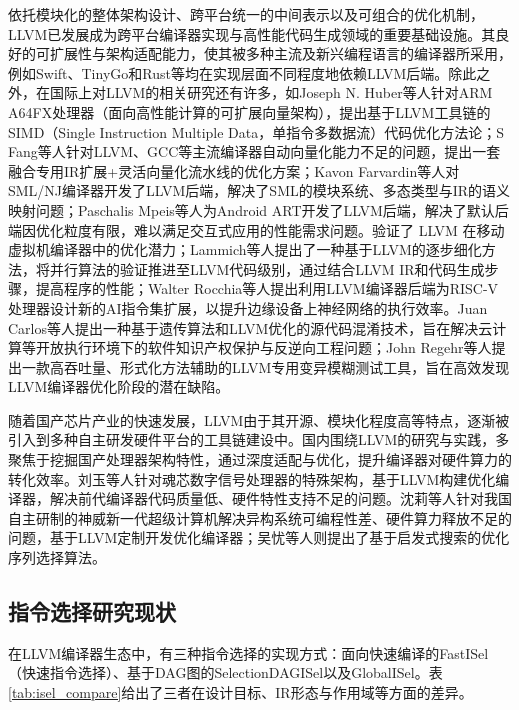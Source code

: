 依托模块化的整体架构设计、跨平台统一的中间表示以及可组合的优化机制，LLVM已发展成为跨平台编译器实现与高性能代码生成领域的重要基础设施。其良好的可扩展性与架构适配能力，使其被多种主流及新兴编程语言的编译器所采用，例如Swift、TinyGo和Rust等均在实现层面不同程度地依赖LLVM后端。除此之外，在国际上对LLVM的相关研究还有许多，如Joseph N. Huber\cite{huber2021case}等人针对ARM A64FX处理器（面向高性能计算的可扩展向量架构），提出基于LLVM工具链的SIMD（Single Instruction Multiple Data，单指令多数据流）代码优化方法论；S Fang等人\cite{fang2025retrofitting}针对LLVM、GCC等主流编译器自动向量化能力不足的问题，提出一套融合专用IR扩展+灵活向量化流水线的优化方案；Kavon Farvardin等人\cite{farvardin2020new}对SML/NJ编译器\cite{appel1991standard}开发了LLVM后端，解决了SML的模块系统、多态类型与IR的语义映射问题；Paschalis Mpeis等人\cite{mpeis2021developer}为Android ART开发了LLVM后端，解决了默认后端因优化粒度有限，难以满足交互式应用的性能需求问题。验证了 LLVM 在移动虚拟机编译器中的优化潜力；Lammich等人\cite{lammich2022refinement}提出了一种基于LLVM的逐步细化方法，将并行算法的验证推进至LLVM代码级别，通过结合LLVM IR和代码生成步骤，提高程序的性能；Walter Rocchia等人\cite{balasubramanian2024designing}提出利用LLVM编译器后端为RISC-V处理器设计新的AI指令集扩展，以提升边缘设备上神经网络的执行效率。Juan Carlos等人\cite{de2025source}提出一种基于遗传算法和LLVM优化的源代码混淆技术，旨在解决云计算等开放执行环境下的软件知识产权保护与反逆向工程问题；John Regehr等人\cite{fan2024high}提出一款高吞吐量、形式化方法辅助的LLVM专用变异模糊测试工具，旨在高效发现LLVM编译器优化阶段的潜在缺陷。

\par

随着国产芯片产业的快速发展，LLVM由于其开源、模块化程度高等特点，逐渐被引入到多种自主研发硬件平台的工具链建设中。国内围绕LLVM的研究与实践，多聚焦于挖掘国产处理器架构特性，通过深度适配与优化，提升编译器对硬件算力的转化效率。刘玉等人\cite{刘玉2020基于}针对魂芯数字信号处理器的特殊架构，基于LLVM构建优化编译器，解决前代编译器代码质量低、硬件特性支持不足的问题。沈莉等人\cite{沈莉2023swllvm}针对我国自主研制的神威新一代超级计算机解决异构系统可编程性差、硬件算力释放不足的问题，基于LLVM定制开发优化编译器；吴忧等人\cite{吴忧2024}则提出了基于启发式搜索的优化序列选择算法。


\subsection{指令选择研究现状}
在LLVM编译器生态中，有三种指令选择的实现方式：面向快速编译的FastISel（快速指令选择）、基于DAG图的SelectionDAGISel以及GlobalISel。表\ref{tab:isel_compare}给出了三者在设计目标、IR形态与作用域等方面的差异。

